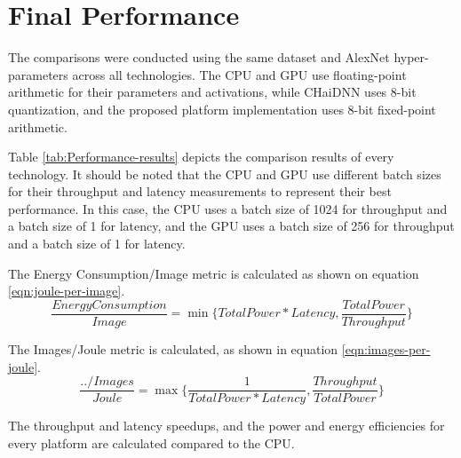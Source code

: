 \section{Final Performance}
The comparisons were conducted using the same dataset and AlexNet hyper-parameters across all technologies. The CPU and GPU use floating-point arithmetic for their parameters and activations, while CHaiDNN uses 8-bit quantization, and the proposed platform implementation uses 8-bit fixed-point arithmetic.

Table \ref{tab:Performance-results} depicts the comparison results of every technology. It should be noted that the CPU and GPU use different batch sizes for their throughput and latency measurements to represent their best performance. In this case, the CPU uses a batch size of 1024 for throughput and a batch size of 1 for latency, and the GPU uses a batch size of 256 for throughput and a batch size of 1 for latency.

The Energy Consumption/Image metric is calculated as shown on equation \ref{eqn:joule-per-image}.
\begin{equation}
	\label{eqn:joule-per-image}
	\frac{Energy Consumption}{Image} = \min \{TotalPower * Latency, \frac{TotalPower}{Throughput}\}
\end{equation}

The Images/Joule metric is calculated, as shown in equation \ref{eqn:images-per-joule}.
\begin{equation}
	\label{eqn:images-per-joule}
	\frac{../Images}{Joule} = \max \{\frac{1}{TotalPower * Latency}, \frac{Throughput}{TotalPower}\}
\end{equation}

The throughput and latency speedups, and the power and energy efficiencies for every platform are calculated compared to the CPU.

